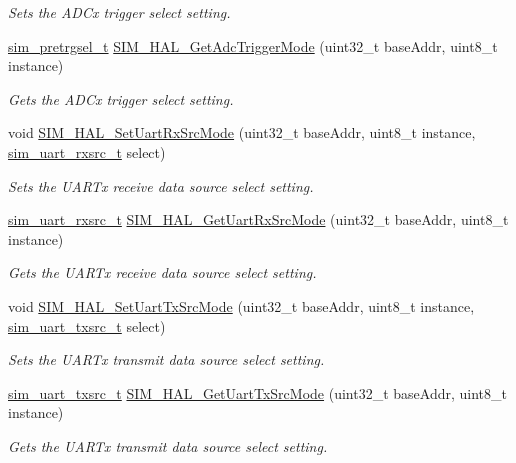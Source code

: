 \begin{DoxyCompactItemize}
\begin{DoxyCompactList}\small\item\em Sets the A\+D\+Cx trigger select setting. \end{DoxyCompactList}\item 
\hyperlink{group__sim__hal_ga507a628a553fa85c2e2180012220d88e}{sim\+\_\+pretrgsel\+\_\+t} \hyperlink{group__sim__hal_ga620bc2cd2cd9bdcb696f47146e81d6bb}{S\+I\+M\+\_\+\+H\+A\+L\+\_\+\+Get\+Adc\+Trigger\+Mode} (uint32\+\_\+t base\+Addr, uint8\+\_\+t instance)
\begin{DoxyCompactList}\small\item\em Gets the A\+D\+Cx trigger select setting. \end{DoxyCompactList}\item 
void \hyperlink{group__sim__hal_ga964f68119e1af83c99797656225507fa}{S\+I\+M\+\_\+\+H\+A\+L\+\_\+\+Set\+Uart\+Rx\+Src\+Mode} (uint32\+\_\+t base\+Addr, uint8\+\_\+t instance, \hyperlink{group__sim__hal_gab6fb25254f344eecbd4c71ff1254c6d0}{sim\+\_\+uart\+\_\+rxsrc\+\_\+t} select)
\begin{DoxyCompactList}\small\item\em Sets the U\+A\+R\+Tx receive data source select setting. \end{DoxyCompactList}\item 
\hyperlink{group__sim__hal_gab6fb25254f344eecbd4c71ff1254c6d0}{sim\+\_\+uart\+\_\+rxsrc\+\_\+t} \hyperlink{group__sim__hal_gaeda6c9d32bca1c7409b22ff46e3f0056}{S\+I\+M\+\_\+\+H\+A\+L\+\_\+\+Get\+Uart\+Rx\+Src\+Mode} (uint32\+\_\+t base\+Addr, uint8\+\_\+t instance)
\begin{DoxyCompactList}\small\item\em Gets the U\+A\+R\+Tx receive data source select setting. \end{DoxyCompactList}\item 
void \hyperlink{group__sim__hal_gaf3339b94a520aaf856b897fd945a435e}{S\+I\+M\+\_\+\+H\+A\+L\+\_\+\+Set\+Uart\+Tx\+Src\+Mode} (uint32\+\_\+t base\+Addr, uint8\+\_\+t instance, \hyperlink{group__sim__hal_gaed9f8dc3d5b7d57cc35c192ef9ea30cb}{sim\+\_\+uart\+\_\+txsrc\+\_\+t} select)
\begin{DoxyCompactList}\small\item\em Sets the U\+A\+R\+Tx transmit data source select setting. \end{DoxyCompactList}\item 
\hyperlink{group__sim__hal_gaed9f8dc3d5b7d57cc35c192ef9ea30cb}{sim\+\_\+uart\+\_\+txsrc\+\_\+t} \hyperlink{group__sim__hal_gab5e67cad8df0b320d6af9787e32bd496}{S\+I\+M\+\_\+\+H\+A\+L\+\_\+\+Get\+Uart\+Tx\+Src\+Mode} (uint32\+\_\+t base\+Addr, uint8\+\_\+t instance)
\begin{DoxyCompactList}\small\item\em Gets the U\+A\+R\+Tx transmit data source select setting. \end{DoxyCompactList}\end{DoxyCompactItemize}
